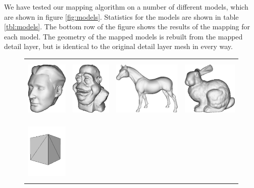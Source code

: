 We have tested our mapping algorithm on a number of different models, which are shown in figure \ref{fig:models}. Statistics for the models are shown in table \ref{tbl:models}. The bottom row of the figure shows the results of the mapping for each model. The geometry of the mapped models is rebuilt from the mapped detail layer, but is identical to the original detail layer mesh in every way.

\begin{figure}
\begin{center}
\begin{tabular}{cccc}
\includegraphics[height=3cm]{../images/cubehead_detail} &
\includegraphics[height=3cm]{../images/dinohead_detail} &
\includegraphics[height=3cm]{../images/horse_detail} &
\includegraphics[height=3cm]{../images/bunny_detail} \\
\includegraphics[height=3cm]{../images/cubehead_control} &

\end{tabular}
\end{center}
\end{figure}
